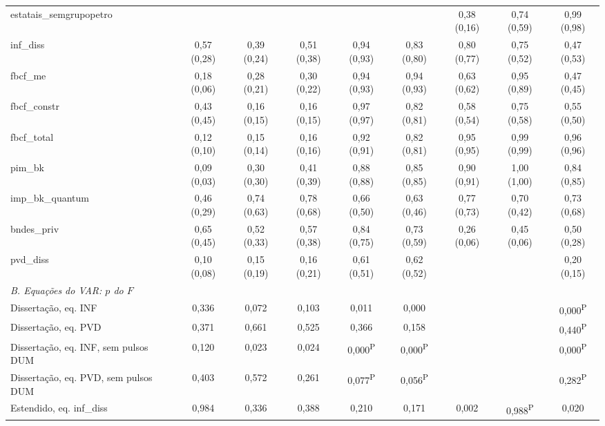 \begin{table}[htbp]
\begin{tabular}{lcccccccc}
estatais\_semgrupopetro &  &  &  &  &  & 0{,}38 (0{,}16) & 0{,}74 (0{,}59) & 0{,}99 (0{,}98) \\
inf\_diss & 0{,}57 (0{,}28) & 0{,}39 (0{,}24) & 0{,}51 (0{,}38) & 0{,}94 (0{,}93) & 0{,}83 (0{,}80) & 0{,}80 (0{,}77) & 0{,}75 (0{,}52) & 0{,}47 (0{,}53) \\
fbcf\_me & 0{,}18 (0{,}06) & 0{,}28 (0{,}21) & 0{,}30 (0{,}22) & 0{,}94 (0{,}93) & 0{,}94 (0{,}93) & 0{,}63 (0{,}62) & 0{,}95 (0{,}89) & 0{,}47 (0{,}45) \\
fbcf\_constr & 0{,}43 (0{,}45) & 0{,}16 (0{,}15) & 0{,}16 (0{,}15) & 0{,}97 (0{,}97) & 0{,}82 (0{,}81) & 0{,}58 (0{,}54) & 0{,}75 (0{,}58) & 0{,}55 (0{,}50) \\
fbcf\_total & 0{,}12 (0{,}10) & 0{,}15 (0{,}14) & 0{,}16 (0{,}16) & 0{,}92 (0{,}91) & 0{,}82 (0{,}81) & 0{,}95 (0{,}95) & 0{,}99 (0{,}99) & 0{,}96 (0{,}96) \\
pim\_bk & 0{,}09 (0{,}03) & 0{,}30 (0{,}30) & 0{,}41 (0{,}39) & 0{,}88 (0{,}88) & 0{,}85 (0{,}85) & 0{,}90 (0{,}91) & 1{,}00 (1{,}00) & 0{,}84 (0{,}85) \\
imp\_bk\_quantum & 0{,}46 (0{,}29) & 0{,}74 (0{,}63) & 0{,}78 (0{,}68) & 0{,}66 (0{,}50) & 0{,}63 (0{,}46) & 0{,}77 (0{,}73) & 0{,}70 (0{,}42) & 0{,}73 (0{,}68) \\
bndes\_priv & 0{,}65 (0{,}45) & 0{,}52 (0{,}33) & 0{,}57 (0{,}38) & 0{,}84 (0{,}75) & 0{,}73 (0{,}59) & 0{,}26 (0{,}06) & 0{,}45 (0{,}06) & 0{,}50 (0{,}28) \\
pvd\_diss & 0{,}10 (0{,}08) & 0{,}15 (0{,}19) & 0{,}16 (0{,}21) & 0{,}61 (0{,}51) & 0{,}62 (0{,}52) &  &  & 0{,}20 (0{,}15) \\
\midrule
\multicolumn{9}{l}{\textit{B. Equa\c{c}\~oes do VAR: $p$ do $F$}} \\
Disserta\c{c}\~ao, eq. INF & 0{,}336 & 0{,}072 & 0{,}103 & 0{,}011 & 0{,}000 &  &  & 0{,}000\textsuperscript{P} \\
Disserta\c{c}\~ao, eq. PVD & 0{,}371 & 0{,}661 & 0{,}525 & 0{,}366 & 0{,}158 &  &  & 0{,}440\textsuperscript{P} \\
Disserta\c{c}\~ao, eq. INF, sem pulsos DUM & 0{,}120 & 0{,}023 & 0{,}024 & 0{,}000\textsuperscript{P} & 0{,}000\textsuperscript{P} &  &  & 0{,}000\textsuperscript{P} \\
Disserta\c{c}\~ao, eq. PVD, sem pulsos DUM & 0{,}403 & 0{,}572 & 0{,}261 & 0{,}077\textsuperscript{P} & 0{,}056\textsuperscript{P} &  &  & 0{,}282\textsuperscript{P} \\
Estendido, eq. inf\_diss & 0{,}984 & 0{,}336 & 0{,}388 & 0{,}210 & 0{,}171 & 0{,}002 & 0{,}988\textsuperscript{P} & 0{,}020 \\

\end{tabular}
\end{table}
